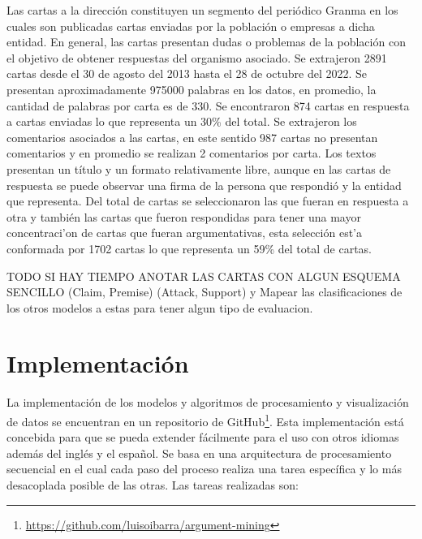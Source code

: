 Las cartas a la dirección constituyen un segmento del periódico Granma en los cuales son publicadas
cartas enviadas por la población o empresas a dicha entidad. En general, las cartas 
presentan dudas o problemas de la población con el objetivo de obtener respuestas del organismo
asociado. Se extrajeron 2891 cartas desde el 30 de agosto del 2013 hasta el 28 de octubre del 2022. Se 
presentan aproximadamente 975000 palabras en los datos, en promedio, la cantidad de palabras por carta es de 330.
Se encontraron 874 cartas en respuesta a cartas enviadas lo que representa un 30\% del total. Se extrajeron
los comentarios asociados a las cartas, en este sentido 987 cartas no presentan comentarios y en promedio 
se realizan 2 comentarios por carta. Los textos presentan un título y un formato relativamente libre, 
aunque en las cartas de respuesta se puede observar una firma de la persona que respondió y la entidad que 
representa. Del total de cartas se seleccionaron las que fueran en respuesta a otra y también las 
cartas que fueron respondidas para tener una mayor concentraci'on de cartas que fueran argumentativas, 
esta selección est'a conformada por 1702 cartas lo que representa un 59\% del total de cartas.

TODO SI HAY TIEMPO ANOTAR LAS CARTAS CON ALGUN ESQUEMA SENCILLO (Claim, Premise) (Attack, Support) y Mapear 
las clasificaciones de los otros modelos a estas para tener algun tipo de evaluacion.

\section{Implementación}

La implementación de los modelos y algoritmos de procesamiento y visualización de datos se encuentran en 
un repositorio de GitHub\footnote{\url{https://github.com/luisoibarra/argument-mining}}. Esta implementación
está concebida para que se pueda extender fácilmente para el uso con otros idiomas además del inglés y el 
español. Se basa en una arquitectura de procesamiento secuencial en el cual cada paso del proceso realiza
una tarea específica y lo más desacoplada posible de las otras. Las tareas realizadas son:

